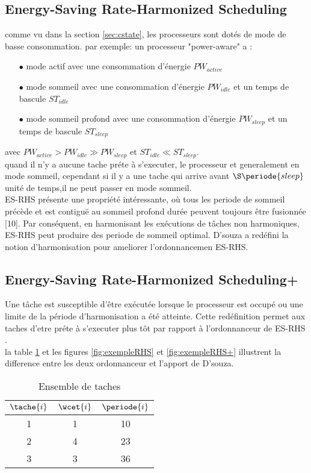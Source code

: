 \subsection{Energy-Saving Rate-Harmonized Scheduling}
comme vu dans la section \ref{sec:cstate}, les processeurs sont dotés de mode de basse consommation.
par exemple: un processeur "power-aware" a :
\vspace{0.5cm}
\begin{itemize}
\item[$\bullet$] mode actif avec une consommation d'énergie $PW_{active}$
\item[$\bullet$] mode sommeil avec une consommation d'énergie $PW_{idle}$ et un temps de bascule $ST_{idle}$
\item[$\bullet$] mode sommeil profond avec une consommation d'énergie $PW_{sleep}$ et un temps de bascule $ST_{sleep}$
\end{itemize}
\vspace{0.5cm}
avec $PW_{active} > PW_{idle} \gg PW_{sleep} $ et $ ST_{idle} \ll ST_{sleep}$.
\\ \indent quand il n'y a aucune tache préte à s'executer, le processeur et generalement en mode sommeil, cependant si il  y a une tache qui arrive avant $\S\periode{sleep}$ unité de temps,il ne peut passer en mode sommeil.
\\ \indent ES-RHS présente une propriété intéressante, où tous les periode de sommeil précède et est contiguë au sommeil profond durée peuvent toujours être fusionnée [10]. Par conséquent, en harmonisant
les exécutions de tâches non harmoniques, ES-RHS peut produire des periode de sommeil optimal. D'souza \cite{DAR16} a redéfini la notion d'harmonisation pour ameliorer l'ordonnancemen ES-RHS.
\subsection{Energy-Saving Rate-Harmonized Scheduling+}
\indent Une tâche est susceptible d'être exécutée lorsque le processeur est occupé ou une limite de la période d'harmonisation a été atteinte. Cette redéfinition permet aux taches d'etre préte à s'executer plus tôt par rapport à l'ordonnanceur de ES-RHS \cite{Rowe10}.
\\ la table \ref{tab:exempleRHS} et les figures \ref{fig:exempleRHS} et \ref{fig:exempleRHS+} illustrent la difference entre les deux ordonnanceur et l'apport de D'souza.

\begin{table}[h]
\begin{center}
\begin{tabular}{|c|c|c|}
 \hline$\tache{i}$ & $\wcet{i}$ & $\periode{i}$ \\ 
 \hline1 & 1 & 10 \\ 
 \hline 2 & 4 & 23 \\ 
 \hline 3 & 3 & 36 \\ 
 \hline 
 \end{tabular}
\end{center}
\caption{Ensemble de taches} \label{tab:exempleRHS}
\end{table}

